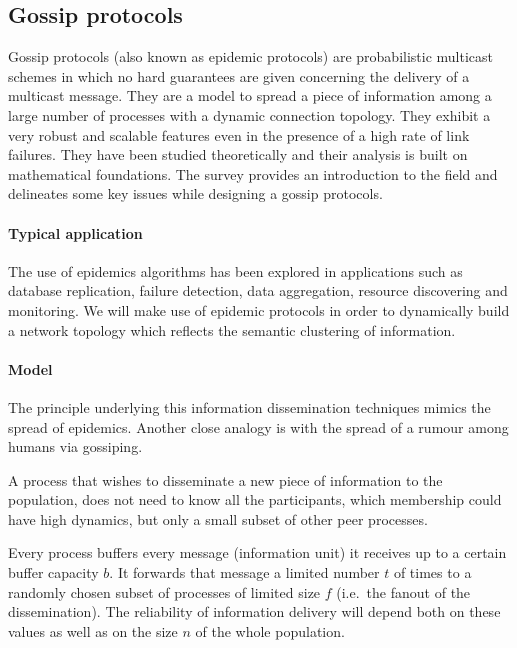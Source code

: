 \subsection{\label{subsec:gossip}Gossip protocols}
Gossip protocols (also known as epidemic protocols) are probabilistic multicast schemes in which no hard guarantees are given concerning the delivery of a multicast message. They are a model to spread a piece of information among a large number of processes with a dynamic connection topology. They exhibit a very robust and scalable features even in the presence of a high rate of link failures. They have been studied theoretically and their analysis is built on mathematical foundations. The survey \cite{EUG04} provides an introduction to the field and delineates some key issues while designing a gossip protocols.

\paragraph{Typical application} The use of epidemics algorithms has been explored in applications such as database replication, failure detection, data aggregation, resource discovering and monitoring. We will make use of epidemic protocols in order to dynamically build a network topology which reflects the semantic clustering of information.

\paragraph{Model}The principle underlying this information dissemination techniques mimics the spread of epidemics. Another close analogy is with the spread of a rumour among humans via gossiping.

A process that wishes to disseminate a new piece of information to the population, does not need to know all the participants, which membership could have high dynamics, but only a small subset of other peer processes.

Every process buffers every message (information unit) it receives up to a certain buffer capacity $b$. It forwards that message a limited number $t$ of times to a randomly chosen subset of processes of limited size $f$ (i.e.\ the fanout of the dissemination). The reliability of information delivery will depend both on these values as well as on the size $n$ of the whole population.


